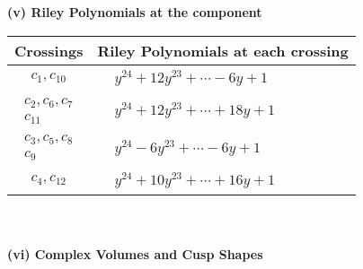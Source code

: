 \documentclass[1p]{elsarticle_modified}
\theoremstyle{definition}
\begin{document}
\newpage\renewcommand{\arraystretch}{1}
\flushleft \textbf{(v) Riley Polynomials at the component}\newline \\
\begin{tabular}{m{50pt}|m{274pt}}
Crossings & \hspace{64pt}Riley Polynomials at each crossing \\
\hline $$\begin{aligned}c_{1},c_{10}\end{aligned}$$&$\begin{aligned}
&y^{24}+12 y^{23}+\cdots-6 y+1
\end{aligned}$\\
\hline $$\begin{aligned}c_{2},c_{6},c_{7}\\c_{11}\end{aligned}$$&$\begin{aligned}
&y^{24}+12 y^{23}+\cdots+18 y+1
\end{aligned}$\\
\hline $$\begin{aligned}c_{3},c_{5},c_{8}\\c_{9}\end{aligned}$$&$\begin{aligned}
&y^{24}-6 y^{23}+\cdots-6 y+1
\end{aligned}$\\
\hline $$\begin{aligned}c_{4},c_{12}\end{aligned}$$&$\begin{aligned}
&y^{24}+10 y^{23}+\cdots+16 y+1
\end{aligned}$\\
\hline
\end{tabular}\\~\\
\newpage\flushleft \textbf{(vi) Complex Volumes and Cusp Shapes}
\end{document}
